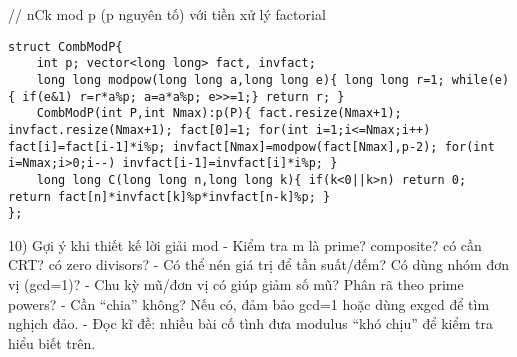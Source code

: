 // nCk mod p (p nguyên tố) với tiền xử lý factorial
\begin{verbatim}
struct CombModP{
    int p; vector<long long> fact, invfact;
    long long modpow(long long a,long long e){ long long r=1; while(e){ if(e&1) r=r*a%p; a=a*a%p; e>>=1;} return r; }
    CombModP(int P,int Nmax):p(P){ fact.resize(Nmax+1); invfact.resize(Nmax+1); fact[0]=1; for(int i=1;i<=Nmax;i++) fact[i]=fact[i-1]*i%p; invfact[Nmax]=modpow(fact[Nmax],p-2); for(int i=Nmax;i>0;i--) invfact[i-1]=invfact[i]*i%p; }
    long long C(long long n,long long k){ if(k<0||k>n) return 0; return fact[n]*invfact[k]%p*invfact[n-k]%p; }
};
\end{verbatim}

10) Gợi ý khi thiết kế lời giải mod
- Kiểm tra m là prime? composite? có cần CRT? có zero divisors?
- Có thể nén giá trị để tần suất/đếm? Có dùng nhóm đơn vị (gcd=1)?
- Chu kỳ mũ/đơn vị có giúp giảm số mũ? Phân rã theo prime powers?
- Cần “chia” không? Nếu có, đảm bảo gcd=1 hoặc dùng exgcd để tìm nghịch đảo.
- Đọc kĩ đề: nhiều bài cố tình đưa modulus “khó chịu” để kiểm tra hiểu biết trên.

